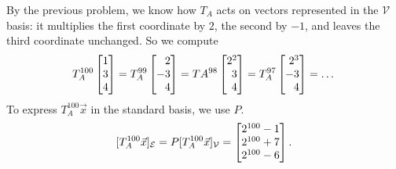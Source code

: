 \documentclass{workbook}
\begin{document}
\begin{slide}
\begin{parts}
\begin{solution}
				By the previous problem, we know how $T_A$ acts on vectors represented
				in the $\mathcal V$ basis: it multiplies the first coordinate by
				$2$, the second by $-1$, and leaves the third coordinate unchanged.
				So we compute
				\[
					T_A^{100}\mat{1\\3\\4}
					=T_A^{99}\mat{2\\-3\\4}
					=TA^{98}\mat{2^2\\3\\4}
					=T_A^{97}\mat{2^3\\-3\\4}
					=\dots
				\]
				To express $T_A^{100}\vec x$ in the standard basis, we use $P$.
				\[
					[T_A^{100}\vec x]_{\mathcal E} = P[T_A^{100}\vec x]_{\mathcal V} = \mat{2^{100}-1\\2^{100}+7\\2^{100}-6}.
				\]
			\end{solution}
	\end{parts}

\end{slide}
\end{document}
